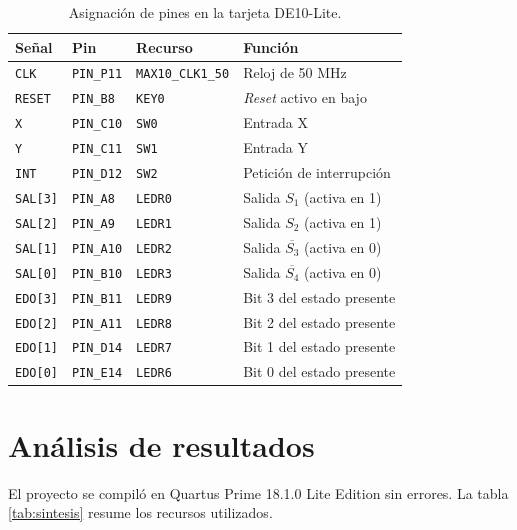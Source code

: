 \begin{table}[H]
  \centering
  \caption{Asignación de pines en la tarjeta DE10-Lite.}
  \label{tab:pines}
  \small
  \begin{tabular}{@{}l l l l@{}}
    \toprule
    \textbf{Señal} & \textbf{Pin} & \textbf{Recurso} & \textbf{Función} \\
    \midrule
    \texttt{CLK}     & \texttt{PIN\_P11} & \texttt{MAX10\_CLK1\_50} & Reloj de 50 MHz \\
    \texttt{RESET}   & \texttt{PIN\_B8}  & \texttt{KEY0}   & \textit{Reset} activo en bajo \\
    \texttt{X}       & \texttt{PIN\_C10} & \texttt{SW0}    & Entrada X \\
    \texttt{Y}       & \texttt{PIN\_C11} & \texttt{SW1}    & Entrada Y \\
    \texttt{INT}     & \texttt{PIN\_D12} & \texttt{SW2}    & Petición de interrupción \\
    \texttt{SAL[3]}  & \texttt{PIN\_A8}  & \texttt{LEDR0}  & Salida $S_1$ (activa en 1) \\
    \texttt{SAL[2]}  & \texttt{PIN\_A9}  & \texttt{LEDR1}  & Salida $S_2$ (activa en 1) \\
    \texttt{SAL[1]}  & \texttt{PIN\_A10} & \texttt{LEDR2}  & Salida $\overline{S_3}$ (activa en 0) \\
    \texttt{SAL[0]}  & \texttt{PIN\_B10} & \texttt{LEDR3}  & Salida $\overline{S_4}$ (activa en 0) \\
    \texttt{EDO[3]}  & \texttt{PIN\_B11} & \texttt{LEDR9}  & Bit 3 del estado presente \\
    \texttt{EDO[2]}  & \texttt{PIN\_A11} & \texttt{LEDR8}  & Bit 2 del estado presente \\
    \texttt{EDO[1]}  & \texttt{PIN\_D14} & \texttt{LEDR7}  & Bit 1 del estado presente \\
    \texttt{EDO[0]}  & \texttt{PIN\_E14} & \texttt{LEDR6}  & Bit 0 del estado presente \\
    \bottomrule
  \end{tabular}
\end{table}

\section{Análisis de resultados}

El proyecto se compiló en Quartus Prime 18.1.0 Lite Edition sin errores. La tabla
\ref{tab:sintesis} resume los recursos utilizados.

